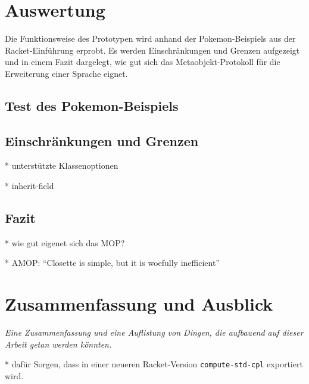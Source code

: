 
\pagestyle{diplHeadings}





\setcounter{page}{1}
\tableofcontents
\cleardoublepage 

\setcounter{page}{1} 
\mainmatter  
{}

 

 






\chapter{Auswertung}
Die Funktionsweise des Prototypen wird anhand der Pokemon-Beispiels aus der Racket-Einführung erprobt. Es werden Einschränkungen und Grenzen aufgezeigt und in einem Fazit dargelegt, wie gut sich das Metaobjekt-Protokoll für die Erweiterung einer Sprache eignet.

\section{Test des Pokemon-Beispiels}

\section{Einschränkungen und Grenzen}
* unterstützte Klassenoptionen

* inherit-field

\section{Fazit}
* wie gut eigenet sich das MOP?

* AMOP: ``Closette is simple, but it is woefully inefficient''


\chapter{Zusammenfassung und Ausblick}
\textit{Eine Zusammenfassung und eine Auflistung von Dingen, die aufbauend auf dieser Arbeit getan werden könnten.}

* dafür Sorgen, dass in einer neueren Racket-Version \texttt{compute-std-cpl} exportiert wird.

\cleardoublepage
{}
{}

  
\cleardoublepage


\cleardoublepage





